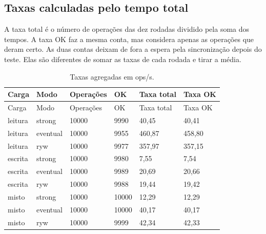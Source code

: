 \subsection{Taxas calculadas pelo tempo total}
A taxa total é o número de operações das dez rodadas dividido pela soma dos tempos. A taxa OK faz a mesma conta, mas considera apenas as operações que deram certo. As duas contas deixam de fora a espera pela sincronização depois do teste. Elas são diferentes de somar as taxas de cada rodada e tirar a média.
\begingroup\small\setlength{\tabcolsep}{4pt}
\begin{longtable}{llllll}
\caption{Taxas agregadas em ops/s.}\\
\toprule
Carga & Modo & Operações & OK & Taxa total & Taxa OK\\\midrule\endfirsthead
\toprule
Carga & Modo & Operações & OK & Taxa total & Taxa OK\\\midrule\endhead
\bottomrule\endfoot
leitura & strong & 10000 & 9990 & 40,45 & 40,41\\
leitura & eventual & 10000 & 9955 & 460,87 & 458,80\\
leitura & ryw & 10000 & 9977 & 357,97 & 357,15\\
escrita & strong & 10000 & 9980 & 7,55 & 7,54\\
escrita & eventual & 10000 & 9989 & 20,69 & 20,66\\
escrita & ryw & 10000 & 9988 & 19,44 & 19,42\\
misto & strong & 10000 & 10000 & 12,29 & 12,29\\
misto & eventual & 10000 & 10000 & 40,17 & 40,17\\
misto & ryw & 10000 & 9999 & 42,34 & 42,33\\
\end{longtable}
\endgroup

